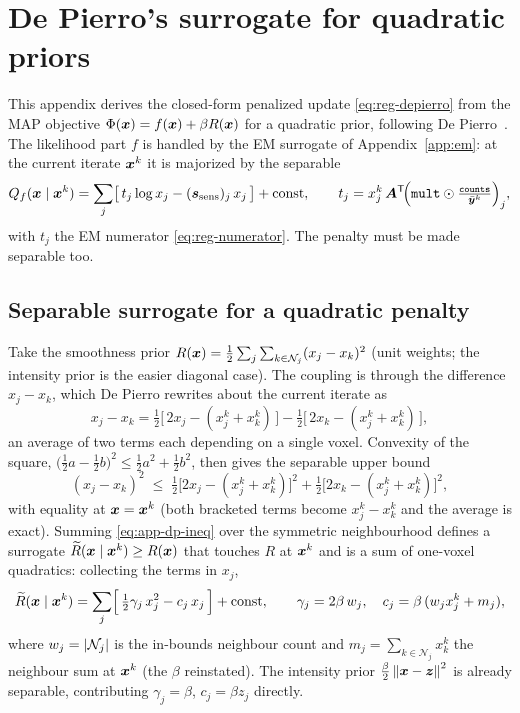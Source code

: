 \section{De Pierro's surrogate for quadratic priors}
\label{app:depierro}

This appendix derives the closed-form penalized update
\eqref{eq:reg-depierro} from the MAP objective
$\Phi(\bm{x})=f(\bm{x})+\beta R(\bm{x})$ for a quadratic prior, following De
Pierro~\cite{depierro1995}. The likelihood part $f$ is handled by the EM surrogate
of Appendix~\ref{app:em}: at the current iterate $\bm{x}^k$ it is majorized by the
separable
\begin{equation}
  Q_f(\bm{x}\mid\bm{x}^k) = \sum_j\bigl[\,t_j\log x_j - (\bm{s}_{\mathrm{sens}})_j\,x_j\,\bigr] + \text{const},
  \qquad
  t_j = x_j^k\,\bm{A}^{\mathsf{T}}\!\Bigl(\texttt{mult}\odot\tfrac{\texttt{counts}}{\bar{\bm{y}}^k}\Bigr)_j,
  \label{eq:app-dp-Qf}
\end{equation}
with $t_j$ the EM numerator \eqref{eq:reg-numerator}. The penalty must be made
separable too.

\subsection*{Separable surrogate for a quadratic penalty}

Take the smoothness prior $R(\bm{x})=\tfrac12\sum_j\sum_{k\in\mathcal N_j}(x_j-x_k)^2$
(unit weights; the intensity prior is the easier diagonal case). The coupling is
through the difference $x_j-x_k$, which De Pierro rewrites about the current
iterate as
\begin{equation}
  x_j-x_k
  = \tfrac12\bigl[\,2x_j-(x_j^k+x_k^k)\,\bigr] - \tfrac12\bigl[\,2x_k-(x_j^k+x_k^k)\,\bigr],
\end{equation}
an average of two terms each depending on a single voxel. Convexity of the square,
$\bigl(\tfrac12 a-\tfrac12 b\bigr)^2\le\tfrac12 a^2+\tfrac12 b^2$, then gives the
separable upper bound
\begin{equation}
  (x_j-x_k)^2 \;\le\; \tfrac12\bigl[2x_j-(x_j^k+x_k^k)\bigr]^2
                    + \tfrac12\bigl[2x_k-(x_j^k+x_k^k)\bigr]^2,
  \label{eq:app-dp-ineq}
\end{equation}
with equality at $\bm{x}=\bm{x}^k$ (both bracketed terms become $x_j^k-x_k^k$ and the
average is exact). Summing \eqref{eq:app-dp-ineq} over the symmetric neighbourhood
defines a surrogate $\widetilde R(\bm{x}\mid\bm{x}^k)\ge R(\bm{x})$ that touches $R$ at
$\bm{x}^k$ and is a sum of one-voxel quadratics: collecting the terms in $x_j$,
\begin{equation}
  \widetilde R(\bm{x}\mid\bm{x}^k)
  = \sum_j\Bigl[\,\tfrac12\gamma_j\,x_j^2 - c_j\,x_j\,\Bigr] + \text{const},
  \qquad
  \gamma_j = 2\beta\,w_j,
  \quad
  c_j = \beta\,(w_j x_j^k + m_j),
  \label{eq:app-dp-Rtilde}
\end{equation}
where $w_j=\left|\mathcal N_j\right|$ is the in-bounds neighbour count and
$m_j=\sum_{k\in\mathcal N_j}x_k^k$ the neighbour sum at $\bm{x}^k$ (the $\beta$
reinstated). The intensity prior $\tfrac{\beta}{2}\left\lVert\bm{x}-\bm z\right\rVert^2$ is already
separable, contributing $\gamma_j=\beta$, $c_j=\beta z_j$ directly.

